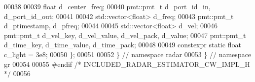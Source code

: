 \begin{DoxyCode}
00038       
00039       \textcolor{keywordtype}{float} d_center_freq;
00040       pmt::pmt\_t d_port_id_in, d_port_id_out;
00041       
00042       std::vector<float> d_freq;
00043       pmt::pmt\_t d_ptimestamp, d_pfreq;
00044       
00045       std::vector<float> d_vel;
00046       pmt::pmt\_t d_vel_key, d_vel_value, d_vel_pack, d_value;
00047       pmt::pmt\_t d_time_key, d_time_value, d_time_pack;
00048       
00049       constexpr \textcolor{keyword}{static} \textcolor{keywordtype}{float} c_light = 3e8;
00050     \};
00051 
00052   \} \textcolor{comment}{// namespace radar}
00053 \} \textcolor{comment}{// namespace gr}
00054 
00055 \textcolor{preprocessor}{#endif }\textcolor{comment}{/* INCLUDED\_RADAR\_ESTIMATOR\_CW\_IMPL\_H */}\textcolor{preprocessor}{}
00056 
\end{DoxyCode}

